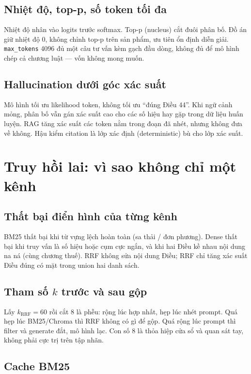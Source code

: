 \subsection{Nhiệt độ, top-p, số token tối đa}

Nhiệt độ nhân vào logits trước softmax. Top-p (nucleus) cắt đuôi phân bố. Đồ án
giữ nhiệt độ 0, không chỉnh top-p trên sản phẩm, ưu tiên ổn định diễn giải.
\texttt{max\_tokens} 4096 đủ một câu tư vấn kèm gạch đầu dòng, không đủ để mô
hình chép cả chương luật --- vốn không mong muốn.

\subsection{Hallucination dưới góc xác suất}

Mô hình tối ưu likelihood token, không tối ưu ``đúng Điều 44''. Khi ngữ cảnh
mỏng, phân bố vẫn gán xác suất cao cho các số hiệu hay gặp trong dữ liệu huấn
luyện. RAG tăng xác suất các token nằm trong đoạn đã nhét, nhưng không đưa về
không. Hậu kiểm citation là lớp xác định (deterministic) bù cho lớp xác suất.

\section{Truy hồi lai: vì sao không chỉ một kênh}

\subsection{Thất bại điển hình của từng kênh}

BM25 thất bại khi từ vựng lệch hoàn toàn (sa thải / đơn phương). Dense thất bại
khi truy vấn là số hiệu hoặc cụm cực ngắn, và khi hai Điều kề nhau nội dung na
ná (cùng chương thuế). RRF không sửa nội dung Điều; RRF chỉ tăng xác suất Điều
đúng có mặt trong union hai danh sách.

\subsection{Tham số $k$ trước và sau gộp}

Lấy $k_{\mathrm{RRF}}=60$ rồi cắt 8 là phễu: rộng lúc hợp nhất, hẹp lúc nhét
prompt. Quá hẹp lúc BM25/Chroma thì RRF không có gì để gộp. Quá rộng lúc prompt
thì filter và generate đắt, mô hình lạc. Con số 8 là thỏa hiệp cửa sổ và quan
sát tay, không phải cực trị trên tập nhãn.

\subsection{Cache BM25}

